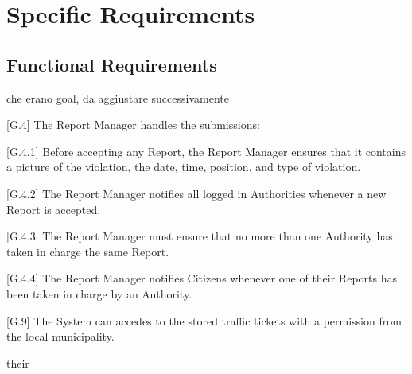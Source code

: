 \documentclass{report}
\begin{document}
\chapter{Specific Requirements}
\section{Functional Requirements}
che erano goal, da aggiustare successivamente
\begin{itemize}
\item {[G.4]} The Report Manager handles the submissions:
    {\setlength\itemindent{25pt} \item {[G.4.1]} Before accepting any Report, the Report Manager ensures that it contains a picture of the violation, the date, time, position, and type of violation.}
    {\setlength\itemindent{25pt} \item {[G.4.2]} The Report Manager notifies all logged in Authorities whenever a new Report is accepted.}
    {\setlength\itemindent{25pt} \item {[G.4.3]} The Report Manager must ensure that no more than one Authority has taken in charge the same Report.}
    {\setlength\itemindent{25pt} \item {[G.4.4]} The Report Manager notifies Citizens whenever one of their Reports has been taken in charge by an Authority.}
\item {[G.9]} The System can accedes to the stored traffic tickets with a permission from the local municipality.
\end{itemize}their
\end{document}

